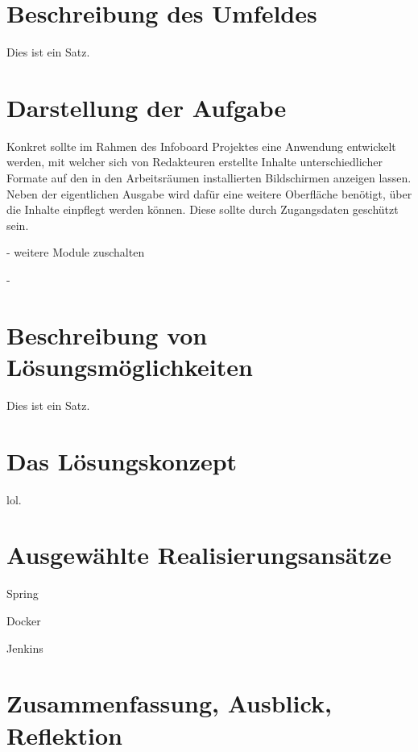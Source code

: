 \documentclass[a4paper, 11pt]{article}
\begin{document}
\tableofcontents
\newpage



\section{Beschreibung des Umfeldes}

Dies ist ein Satz.

\section{Darstellung der Aufgabe}

Konkret sollte im Rahmen des Infoboard Projektes eine Anwendung entwickelt werden, mit welcher sich von Redakteuren erstellte Inhalte unterschiedlicher Formate auf den in den Arbeitsräumen installierten Bildschirmen anzeigen lassen. Neben der eigentlichen Ausgabe wird dafür eine weitere Oberfläche benötigt, über die Inhalte einpflegt werden können. Diese sollte durch Zugangsdaten geschützt sein.

- weitere Module zuschalten

- 

\section{Beschreibung von Lösungsmöglichkeiten}

Dies ist ein Satz.

\section{Das Lösungskonzept}

lol.

\section{Ausgewählte Realisierungsansätze}

Spring

Docker

Jenkins

\section{Zusammenfassung, Ausblick, Reflektion}

\end{document}
